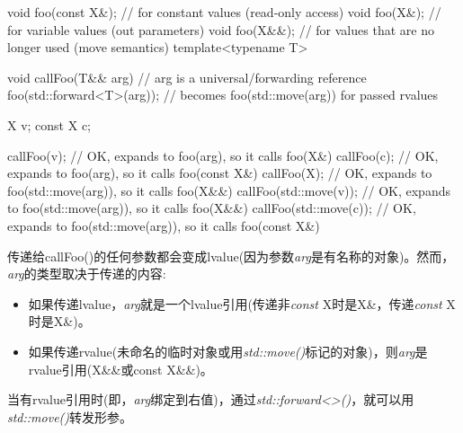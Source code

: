 \begin{cppcode}
void foo(const X&); // for constant values (read-only access)
void foo(X&); // for variable values (out parameters)
void foo(X&&); // for values that are no longer used (move semantics)
template<typename T>

void callFoo(T&& arg) { // arg is a universal/forwarding reference
	foo(std::forward<T>(arg)); // becomes foo(std::move(arg)) for passed rvalues
}

X v;
const X c;

callFoo(v); // OK, expands to foo(arg), so it calls foo(X&)
callFoo(c); // OK, expands to foo(arg), so it calls foo(const X&)
callFoo(X{}); // OK, expands to foo(std::move(arg)), so it calls foo(X&&)
callFoo(std::move(v)); // OK, expands to foo(std::move(arg)), so it calls foo(X&&)
callFoo(std::move(c)); // OK, expands to foo(std::move(arg)), so it calls foo(const X&)
\end{cppcode}

传递给callFoo()的任何参数都会变成lvalue(因为参数\textit{arg}是有名称的对象)。然而，\textit{arg}的类型取决于传递的内容:

\begin{itemize}
	\item 如果传递lvalue，\textit{arg}就是一个lvalue引用(传递非\textit{const} X时是X\&，传递\textit{const} X时是X\&)。
	\item 如果传递rvalue(未命名的临时对象或用\textit{std::move()}标记的对象)，则\textit{arg}是rvalue引用(X\&\&或const X\&\&)。
\end{itemize}

当有rvalue引用时(即，\textit{arg}绑定到右值)，通过\textit{std::forward<>()}，就可以用\textit{std::move()}转发形参。




















